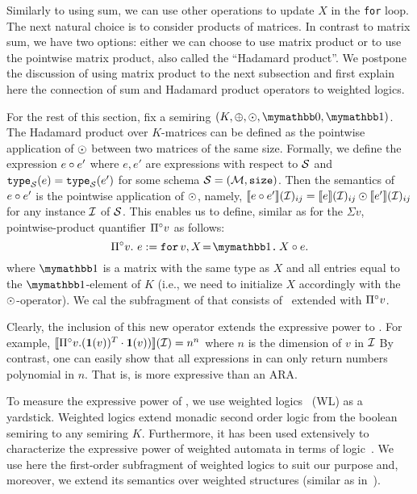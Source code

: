 Similarly to using sum, we can use other operations to update $X$ in the \texttt{for} loop. The next natural choice is to consider products of matrices. In contrast to matrix sum, we have two options: either we can choose to use matrix product or to use the pointwise matrix product, also called the ``Hadamard product''. We postpone the discussion of using matrix product to the next subsection and first explain here the connection of sum and Hadamard product operators to weighted logics.

For the rest of this section, fix a semiring $(K, \ksum, \kprod, \kzero, \kone)$. The Hadamard product over $K$-matrices can be defined as the pointwise application of $\odot$ between two matrices of the same size. Formally, we define the expression $e \circ e'$ where $e, e'$ are expressions with respect to $\mathcal{S}$ and $\texttt{type}_{\mathcal{S}}(e) = \texttt{type}_{\mathcal{S}}(e')$ for some schema $\mathcal{S}=(\mathcal{M},\texttt{size})$. Then the semantics of $e \circ e'$ is the pointwise application of $\odot$, namely, $\llbracket e \circ e' \rrbracket(\mathcal{I})_{ij} = \llbracket e \rrbracket(\mathcal{I})_{ij} \odot \llbracket e' \rrbracket(\mathcal{I})_{ij}$ for any instance $\mathcal{I}$ of $\mathcal{S}$. This enables us to define, similar as for the $\Sigma v$, pointwise-product quantifier $\Pi^{\circ} v$ as follows:
$$
\qhadprod v. \  e := \ffor{v}{X\!=\!\kone}{X \circ e}.
$$
where $\kone$ is a matrix with the same type as $X$ and all entries equal to the $\kone$-element of $K$ (i.e., we need to initialize $X$ accordingly with the $\odot$-operator).
We cal \langprod  the subfragment of \langfor that consists of \langsum \ extended with $\Pi^{\circ} v$.

Clearly, the inclusion of this new operator extends the expressive power to \langsum. For example,  $\llbracket \Pi^{\circ} v. (\mathbf{1}(v))^T\cdot \mathbf{1}(v)) \rrbracket(\mathcal{I}) = n^n$ where $n$ is the dimension of $v$ in $\mathcal{I}$
By contrast, one can easily show that all expressions in \langsum can only return numbers polynomial in  $n$. That is, \langprod is more expressive than \langsum an ARA. 

To measure the expressive power of \langprod, we use weighted logics~\cite{DrosteG05} (WL) as a yardstick. Weighted logics extend monadic second order logic from the boolean semiring to any semiring $K$. Furthermore, it has been used extensively to characterize the expressive power of weighted automata in terms of logic~\cite{droste2009handbook}. We use here the first-order subfragment of weighted logics to suit our purpose and, moreover, we extend its semantics over weighted structures (similar as in~\cite{GradelV17}).

